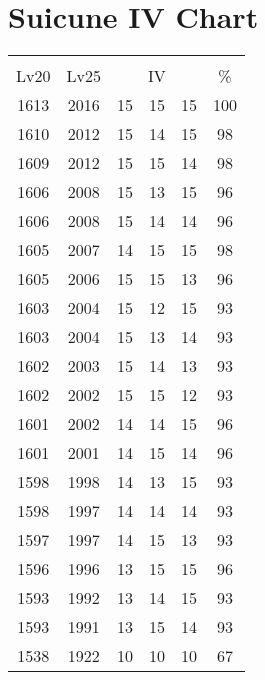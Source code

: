 \documentclass{article}%
\begin{document}
%
\normalsize%
\section{Suicune IV Chart}%
\label{sec:Suicune IV Chart}%
\renewcommand{\arraystretch}{1.5}%
\begin{tabular}{|c|c|c|c|c|c|}%
\hline%
\multicolumn{6}{|c|}{\textcolor{white}{ 
\linebreak{Suicune}
}%
\cellcolor{black}}\\%
\multicolumn{1}{|c}{Lv20}&\multicolumn{1}{c|}{Lv25}&\multicolumn{3}{c|}{IV}&\multicolumn{1}{|c|}{\%}\\%
\hline%
\rowcolor{color100}%
1613&2016&15&15&15&100\\%
\hline%
\rowcolor{color98}%
1610&2012&15&14&15&98\\%
\hline%
\rowcolor{color98}%
1609&2012&15&15&14&98\\%
\hline%
\rowcolor{color96}%
1606&2008&15&13&15&96\\%
\hline%
\rowcolor{color96}%
1606&2008&15&14&14&96\\%
\hline%
\rowcolor{color98}%
1605&2007&14&15&15&98\\%
\hline%
\rowcolor{color96}%
1605&2006&15&15&13&96\\%
\hline%
\rowcolor{color93}%
1603&2004&15&12&15&93\\%
\hline%
\rowcolor{color93}%
1603&2004&15&13&14&93\\%
\hline%
\rowcolor{color93}%
1602&2003&15&14&13&93\\%
\hline%
\rowcolor{color93}%
1602&2002&15&15&12&93\\%
\hline%
\rowcolor{color96}%
1601&2002&14&14&15&96\\%
\hline%
\rowcolor{color96}%
1601&2001&14&15&14&96\\%
\hline%
\rowcolor{color93}%
1598&1998&14&13&15&93\\%
\hline%
\rowcolor{color93}%
1598&1997&14&14&14&93\\%
\hline%
\rowcolor{color93}%
1597&1997&14&15&13&93\\%
\hline%
\rowcolor{color96}%
1596&1996&13&15&15&96\\%
\hline%
\rowcolor{color93}%
1593&1992&13&14&15&93\\%
\hline%
\rowcolor{color93}%
1593&1991&13&15&14&93\\%
\hline%
\rowcolor{color91}%
1538&1922&10&10&10&67\\%
\end{tabular}

%
\end{document}
